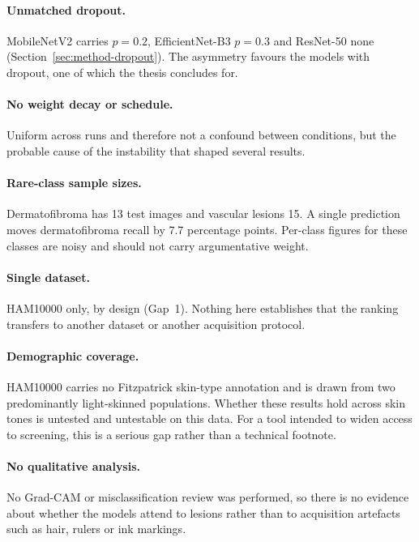 \paragraph{Unmatched dropout.} MobileNetV2 carries $p = 0.2$, EfficientNet-B3 $p = 0.3$
and ResNet-50 none (Section~\ref{sec:method-dropout}). The asymmetry favours the models
with dropout, one of which the thesis concludes for.

\paragraph{No weight decay or schedule.} Uniform across runs and therefore not a
confound between conditions, but the probable cause of the instability that shaped
several results.

\paragraph{Rare-class sample sizes.} Dermatofibroma has 13 test images and vascular
lesions 15. A single prediction moves dermatofibroma recall by 7.7 percentage points.
Per-class figures for these classes are noisy and should not carry argumentative weight.

\paragraph{Single dataset.} HAM10000 only, by design (Gap~1). Nothing here establishes
that the ranking transfers to another dataset or another acquisition protocol.

\paragraph{Demographic coverage.} HAM10000 carries no Fitzpatrick skin-type annotation
and is drawn from two predominantly light-skinned populations. Whether these results hold
across skin tones is untested and untestable on this data. For a tool intended to widen
access to screening, this is a serious gap rather than a technical footnote.

\paragraph{No qualitative analysis.} No Grad-CAM or misclassification review was
performed, so there is no evidence about whether the models attend to lesions rather
than to acquisition artefacts such as hair, rulers or ink markings.
